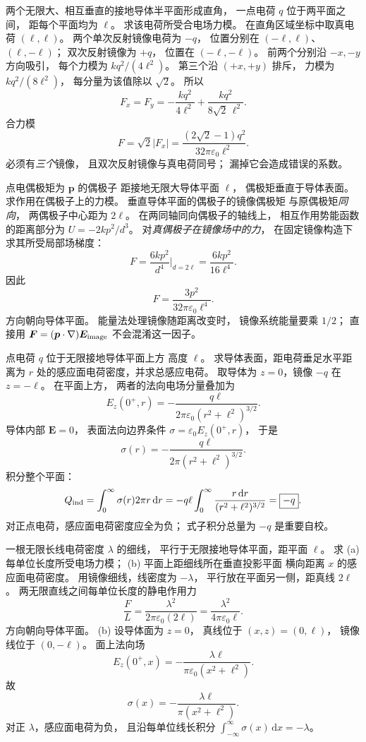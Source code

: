 两个无限大、相互垂直的接地导体半平面形成直角，
一点电荷 $q$ 位于两平面之间，
距每个平面均为 $\ell$。
求该电荷所受合电场力模。
\exsolution
在直角区域坐标中取真电荷 $(\ell,\ell)$。
两个单次反射镜像电荷为 $-q$，
位置分别在 $(-\ell,\ell)$、
$(\ell,-\ell)$；
双次反射镜像为 $+q$，
位置在 $(-\ell,-\ell)$。
前两个分别沿 $-x,-y$ 方向吸引，
每个力模为 $kq^2/(4\ell^2)$。
第三个沿 $(+x,+y)$ 排斥，
力模为 $kq^2/(8\ell^2)$，
每分量为该值除以 $\sqrt2$。
所以
\[
F_x=F_y=
-\frac{kq^2}{4\ell^2}
+\frac{kq^2}{8\sqrt2\,\ell^2}.
\]
合力模
\[
\boxed{F=
\sqrt2|F_x|=
\frac{(2\sqrt2-1)q^2}
{32\pi\varepsilon_0\ell^2}}.
\]
\excheck 必须有\emph{三个}镜像，
且双次反射镜像与真电荷同号；
漏掉它会造成错误的系数。

点电偶极矩为 $\bm p$ 的偶极子
距接地无限大导体平面 $\ell$，
偶极矩垂直于导体表面。
求作用在偶极子上的力模。
\exsolution
垂直导体平面的偶极子的镜像偶极矩
与原偶极矩\emph{同向}，
两偶极子中心距为 $2\ell$。
在两同轴同向偶极子的轴线上，
相互作用势能函数的距离部分为
$U=-2kp^2/d^3$。
对\emph{真偶极子在镜像场中的力}，
在固定镜像构造下求其所受局部场梯度：
\[
F=\frac{6kp^2}{d^4}\bigg|_{d=2\ell}
=\frac{6kp^2}{16\ell^4}.
\]
因此
\[
\boxed{F=\frac{3p^2}{32\pi\varepsilon_0\ell^4}}.
\]
方向朝向导体平面。
\excheck 能量法处理镜像随距离改变时，
镜像系统能量要乘 $1/2$；
直接用 $\bm F=(\bm p\cdot\nabla)\bm E_{\rm image}$
不会混淆这一因子。

点电荷 $q$ 位于无限接地导体平面上方
高度 $\ell$。
求导体表面，距电荷垂足水平距离为 $r$
处的感应面电荷密度，并求总感应电荷。
\exsolution
取导体为 $z=0$，镜像 $-q$ 在 $z=-\ell$。
在平面上方，
两者的法向电场分量叠加为
\[
E_z(0^+,r)=
-\frac{q\ell}{2\pi\varepsilon_0
(r^2+\ell^2)^{3/2}}.
\]
导体内部 $\bm E=0$，
表面法向边界条件
$\sigma=\varepsilon_0E_z(0^+,r)$，
于是
\[
\boxed{\sigma(r)=
-\frac{q\ell}{2\pi(r^2+\ell^2)^{3/2}}}.
\]
积分整个平面：
\[
Q_{\rm ind}
=\int_0^\infty\sigma(r)2\pi r\,\mathrm dr
=-q\ell\int_0^\infty
\frac{r\,\mathrm dr}{(r^2+\ell^2)^{3/2}}
=\boxed{-q}.
\]
\excheck 对正点电荷，感应面电荷密度应全为负；
式子积分总量为 $-q$ 是重要自校。

一根无限长线电荷密度 $\lambda$ 的细线，
平行于无限接地导体平面，距平面 $\ell$。
求 (a) 每单位长度所受电场力模；
(b) 平面上距细线所在垂直投影平面
横向距离 $x$ 的感应面电荷密度。
\exsolution
用镜像细线，线密度为 $-\lambda$，
平行放在平面另一侧，距真线 $2\ell$。
两无限直线之间每单位长度的静电作用力
\[
\boxed{\frac FL=
\frac{\lambda^2}{2\pi\varepsilon_0(2\ell)}
=\frac{\lambda^2}{4\pi\varepsilon_0\ell}}.
\]
方向朝向导体平面。
(b) 设导体面为 $z=0$，
真线位于 $(x,z)=(0,\ell)$，
镜像线位于 $(0,-\ell)$。
面上法向场
\[
E_z(0^+,x)
=-\frac{\lambda\ell}{\pi\varepsilon_0(x^2+\ell^2)}.
\]
故
\[
\boxed{\sigma(x)=
-\frac{\lambda\ell}{\pi(x^2+\ell^2)}}.
\]
\excheck 对正 $\lambda$，感应面电荷为负，
且沿每单位线长积分
$\int_{-\infty}^\infty\sigma(x)\,\mathrm dx=-\lambda$。

